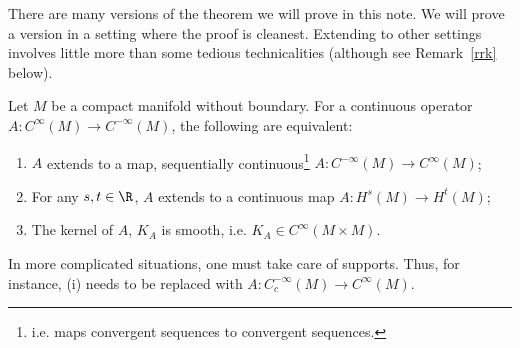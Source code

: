 \documentclass[12pt]{article}
\begin{document}
There are many versions of the theorem we will prove in this note. We will prove a version in a setting where the proof is cleanest. Extending to other settings involves little more than some tedious technicalities (although see Remark~\ref{rrk} below). 
\begin{thm}Let $M$ be a compact manifold without boundary. For a continuous operator $A:C^\infty(M) \to C^{-\infty}(M)$, the following are equivalent:
\begin{enumerate}[label = (\roman*)]
\item $A$ extends to a map, sequentially continuous\footnote{i.e. maps convergent sequences to convergent sequences.} $A:C^{-\infty}(M) \to C^\infty(M)$;
\item For any $s,t \in \R$, $A$ extends to a continuous map $A:H^{s}(M) \to H^{t}(M)$;
\item The kernel of $A$, $K_A$ is smooth, i.e. $K_A \in C^\infty(M\times M)$.
\end{enumerate}
\end{thm}
\begin{rk}\label{rrk}In more complicated situations, one must take care of supports. Thus, for instance, (i) needs to be replaced with $A:C_c^{-\infty}(M) \to C^\infty(M)$.\end{rk}
\end{document}
